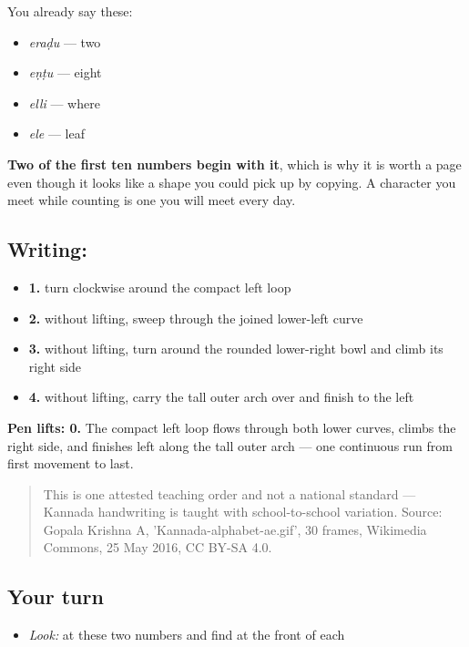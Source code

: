 You already say these:

\begin{itemize}
\raggedright
  \item \textbf{} \emph{eraḍu} — two
  \item \textbf{} \emph{eṇṭu} — eight
  \item \textbf{} \emph{elli} — where
  \item \textbf{} \emph{ele} — leaf
\end{itemize}

\textbf{Two of the first ten numbers begin with it}, which is why it is worth a page even though it looks like a shape you could pick up by copying. A character you meet while counting is one you will meet every day.

\subsection*{Writing: }

\begin{itemize}
\raggedright
  \item \textbf{1.} turn clockwise around the compact left loop
  \item \textbf{2.} without lifting, sweep through the joined lower-left curve
  \item \textbf{3.} without lifting, turn around the rounded lower-right bowl and climb its right side
  \item \textbf{4.} without lifting, carry the tall outer arch over and finish to the left
\end{itemize}

\textbf{Pen lifts: 0.} The compact left loop flows through both lower curves, climbs the right side, and finishes left along the tall outer arch — one continuous run from first movement to last.

\begin{quote}
This is one attested teaching order and not a national standard — Kannada handwriting is taught with school-to-school variation. Source: Gopala Krishna A, 'Kannada-alphabet-ae.gif', 30 frames, Wikimedia Commons, 25 May 2016, CC BY-SA 4.0.
\end{quote}

\subsection*{Your turn}
\begin{itemize}
\raggedright
  \item \emph{Look:} at these two numbers and find  at the front of each
\end{itemize}

